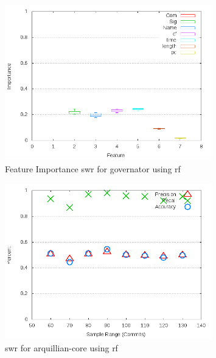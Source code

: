 \begin{figure}[!t]
\centering
\includegraphics[width=0.8\textwidth]{images/rf/test_1/governator_importance.png}
\caption{Feature Importance \gls{swr} for governator using \gls{rf}}
\label{fig:test_1_governator_rf_importance}
\end{figure}

\begin{figure}[!t]
\centering
\includegraphics[width=0.8\textwidth]{images/rf/test_1/arquillian-core_sample_range.png}
\caption{\gls{swr} for arquillian-core using \gls{rf}}
\label{fig:test_1_arquillian-core_rf}
\end{figure}

